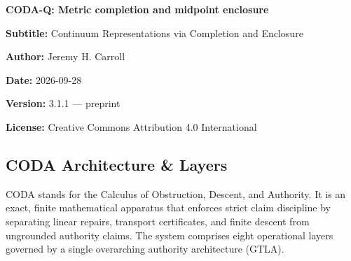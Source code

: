 \documentclass[
  11pt,
]{article}
\begin{document}
\begin{center}
{\Large\bfseries CODA-Q: Metric completion and midpoint enclosure}\par
\textbf{Subtitle:} Continuum Representations via Completion and Enclosure

\textbf{Author:} Jeremy H. Carroll

\textbf{Date:} 2026-09-28

\textbf{Version:} 3.1.1 --- preprint

\textbf{License:} Creative Commons Attribution 4.0 International

\end{center}

\subsection{CODA Architecture \& Layers}\label{coda-architecture-layers}

CODA stands for the Calculus of Obstruction, Descent, and Authority. It is an exact, finite mathematical apparatus that enforces strict claim discipline by separating linear repairs, transport certificates, and finite descent from ungrounded authority claims. The system comprises eight operational layers governed by a single overarching authority architecture (GTLA).
\end{document}
